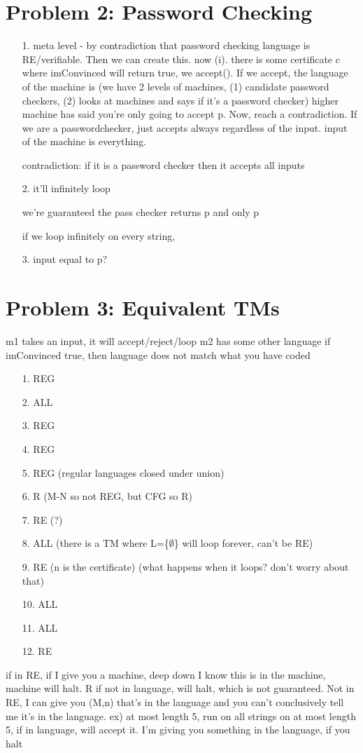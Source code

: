 \documentclass[10pt,letter]{article}
\begin{document}
\section*{Problem 2: Password Checking}
\begin{enumerate}
\item[1.] 
meta level - by contradiction that password checking language is RE/verifiable. Then we can create this. now (i). there is some certificate c where imConvinced will return true, we accept(). If we accept, the language of the machine is (we have 2 levels of machines, (1) candidate password checkers, (2) looks at machines and says if it's a password checker) higher machine has said you're only going to accept p. Now, reach a contradiction. If we are a passwordchecker, just accepts always regardless of the input. input of the machine is everything.

contradiction: if it is a password checker then it accepts all inputs
\item[2.]
it'll infinitely loop 

we're guaranteed the pass checker returns p and only p

if we loop infinitely on every string, 
\item[3.]
input equal to p?
\end{enumerate}

\section*{Problem 3: Equivalent TMs}
m1 takes an input, it will accept/reject/loop
m2 has some other language
if imConvinced true, then language does not match what you have coded


\begin{enumerate}
\item[1.] REG
\item[2.] ALL
\item[3.] REG
\item[4.] REG
\item[5.] REG (regular languages closed under union)
\item[6.] R (M-N so not REG, but CFG so R)
\item[7.] RE (?)
\item[8.] ALL (there is a TM where L=\{$\emptyset$\} will loop forever, can't be RE)
\item[9.] RE (n is the certificate) (what happens when it loops? don't worry about that)
\item[10.] ALL
\item[11.] ALL
\item[12.] RE 
\end{enumerate}
if in RE, if I give you a machine, deep down I know this is in the machine, machine will halt. R if not in language, will halt, which is not guaranteed. Not in RE, I can give you (M,n) that's in the language and you can't conclusively tell me it's in the language. ex) at most length 5, run on all strings on at most length 5, if in language, will accept it. I'm giving you something in the language, if you halt
\end{document}
